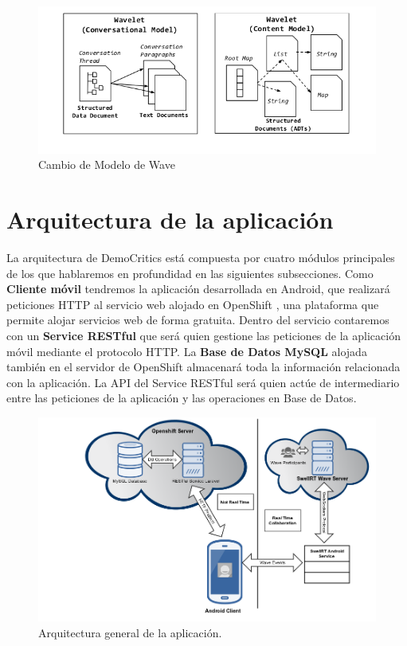 	
	\begin{figure}[H]
	  \centering
	    \includegraphics[keepaspectratio, scale=0.6]{Media/Captures/waveDataModel.png}
	  \caption{Cambio de Modelo de Wave}
	  \label{fig:wave_swellRT}
	\end{figure}

\section{Arquitectura de la aplicación}

La arquitectura de DemoCritics está compuesta por cuatro módulos principales de los que hablaremos en profundidad en las siguientes subsecciones. Como \textbf{Cliente móvil} tendremos la aplicación desarrollada en Android, que realizará peticiones HTTP al servicio web alojado en OpenShift \cite{ref:OpenShift}, una plataforma que permite alojar servicios web de forma gratuita. Dentro del servicio contaremos con un \textbf{Service RESTful} que será quien gestione las peticiones de la aplicación móvil mediante el protocolo HTTP. La \textbf{Base de Datos MySQL} alojada también en el servidor de OpenShift almacenará toda la información relacionada con la aplicación. La API del Service RESTful será quien actúe de intermediario entre las peticiones de la aplicación y las operaciones en Base de Datos.

\begin{figure}[H]
\centering
\includegraphics[keepaspectratio, scale=0.45]{Media/Diagrams/generalArchitectureDiagram.png}
\caption{Arquitectura general de la aplicación.}
\label{fig:architecture}
\end{figure}

